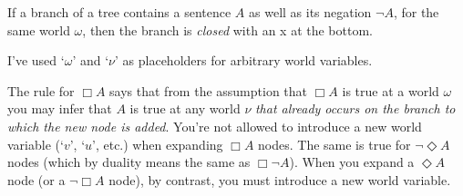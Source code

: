\vspace{10mm}

\begin{minipage}{0.33\textwidth}\centering
{}
\end{minipage}
\begin{minipage}{0.33\textwidth}\centering
{}
\end{minipage}
\begin{minipage}{0.33\textwidth}\centering
{}
\end{minipage}

\vspace{10mm}

\begin{minipage}{0.33\textwidth}\centering
{}
\end{minipage}

\vspace{5mm}

If a branch of a tree contains a sentence $A$ as well as its negation $\neg A$,
for the same world $\omega$, then the branch is \emph{closed} with an {\sffamily
  x} at the bottom.

I've used `$\omega$' and `$\nu$' as placeholders for arbitrary world variables.

The rule for $\Box A$ says that from the assumption that $\Box A$ is true at a
world $\omega$ you may infer that $A$ is true at any world $\nu$ \emph{that
  already occurs on the branch to which the new node is added}. You're not
allowed to introduce a new world variable (`$v$', `$u$', etc.) when expanding
$\Box A$ nodes. The same is true for $\neg \Diamond A$ nodes (which by duality
means the same as $\Box \neg A$). When you expand a $\Diamond A$ node (or a
$\neg \Box A$ node), by contrast, you must introduce a new world variable.

